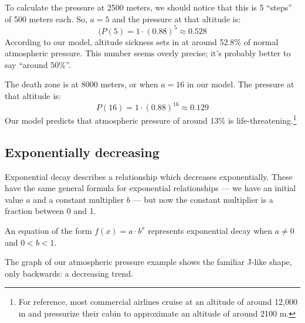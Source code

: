 To calculate the pressure at 2500 meters, we should notice that this is 5 ``steps'' of 500 meters each. So, $a=5$ and the pressure at that altitude is:
\[(P(5) = 1\cdot(0.88)^5 \approx 0.528\]
According to our model, altitude sickness sets in at around 52.8\% of normal atmospheric pressure. This number seems overly precise; it's probably better to say ``around 50\%''.

The death zone is at 8000 meters, or when $a=16$ in our model. The pressure at that altitude is:
\[P(16) = 1\cdot(0.88)^{16} \approx 0.129\]
Our model predicts that atmospheric pressure of around 13\% is life-threatening.\footnote{For reference, most commercial airlines cruise at an altitude of around 12,000 m and pressurize their cabin to approximate an altitude of around 2100 m.}

\subsection{Exponentially decreasing}

Exponential decay describes a relationship which decreases exponentially. These have the same general formula for exponential relationships --- we have an initial value $a$ and a constant multiplier $b$ --- but now the constant multiplier is a fraction between 0 and 1.

\begin{boxeddef}
An equation of the form $f(x) = a \cdot b^x$ represents exponential decay when $a \neq 0$ and $0 < b < 1$.
\end{boxeddef}

The graph of our atmospheric pressure example shows the familiar J-like shape, only backwards: a decreasing trend.

\begin{center}
\end{center}

